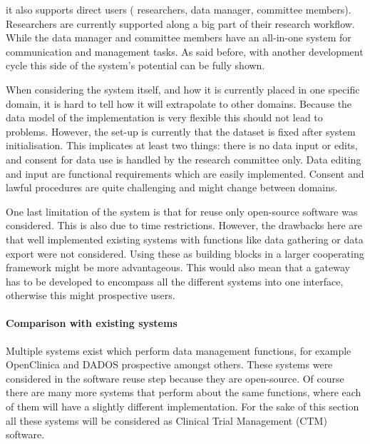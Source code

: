  it also supports direct users (\ie{} researchers, data manager, committee members).
Researchers are currently supported along a big part of their research workflow.
While the data manager and committee members have an all-in-one system for communication and management tasks.
As said before, with another development cycle this side of the system's potential can be fully shown.

When considering the system itself, and how it is currently placed in one specific domain, it is hard to tell how it will extrapolate to other domains.
Because the data model of the implementation is very flexible this should not lead to problems.
However, the set-up is currently that the dataset is fixed after system initialisation.
This implicates at least two things: there is no data input or edits, and consent for data use is handled by the research committee only.
Data editing and input are functional requirements which are easily implemented.
Consent and lawful procedures are quite  challenging and might change between domains.

One last limitation of the system is that for reuse only open-source software was considered.
This is also due to time restrictions.
However, the drawbacks here are that well implemented existing systems with functions like data gathering or data export were not considered.
Using these as building blocks in a larger cooperating framework might be more advantageous.
This would also mean that a gateway has to be developed to encompass all the different systems into one interface, otherwise this might  prospective users.



\paragraph{Comparison with existing systems}
Multiple systems exist which perform data management functions, for example OpenClinica and DADOS prospective amongst others.
These systems were considered in the software reuse step because they are open-source.
Of course there are many more systems that perform about the same functions, where each of them will have a slightly different implementation.
For the sake of this section all these systems will be considered as Clinical Trial Management (CTM) software.

